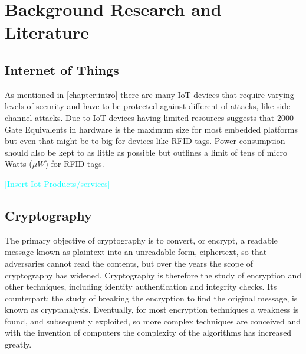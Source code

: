 \documentclass[12pt,twoside,a4paper]{report}
\begin{document}
    \chapter{Background Research and Literature}
    \label{chapter:research}
    
    \section{Internet of Things}
    \label{section:IoT}
    As mentioned in \autoref{chapter:intro} there are many IoT devices that require varying levels of security and have to be protected against different of attacks, like side channel attacks.
    Due to IoT devices having limited resources \cite{Juels2005} suggests that 2000 Gate Equivalents in hardware is the maximum size for most embedded platforms but even that might be to big for devices like RFID tags. Power consumption should also be kept to as little as possible but \cite{David2011} outlines a limit of tens of micro Watts ($\mu W$) for RFID tags.
    
    \textcolor{cyan}{[Insert Iot Products/services]}
    
    \section{Cryptography}
    The primary objective of cryptography is to convert, or encrypt, a readable message known as plaintext into an unreadable form, ciphertext, so that adversaries cannot read the contents, but over the years the scope of cryptography has widened.
    Cryptography is therefore the study of encryption and other techniques, including identity authentication and integrity checks. Its counterpart: the study of breaking the encryption to find the original message, is known as cryptanalysis\cite{AlfredJ.Menezes1996}.
    Eventually, for most encryption techniques a weakness is found, and subsequently exploited, so more complex techniques are conceived and with the invention of computers the complexity of the algorithms has increased greatly.
    
\end{document}
